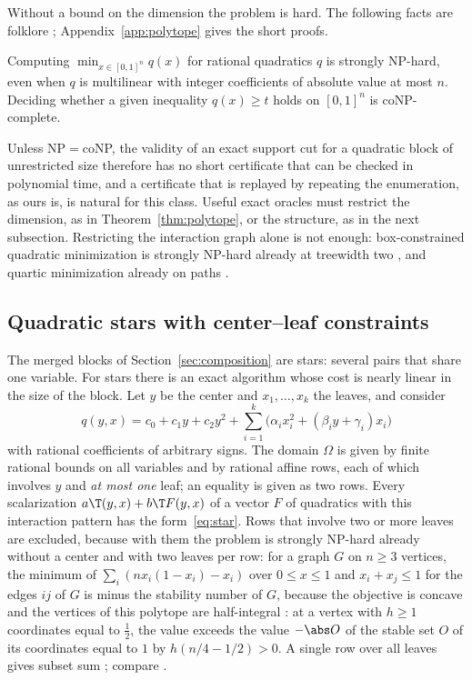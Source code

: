 Without a bound on the dimension the problem is hard. The following facts
are folklore \citep[Section~2.3]{BurerLetchford2009}; Appendix~\ref{app:polytope}
gives the short proofs.

\begin{proposition}\label{prop:maxcut}
Computing $\min_{x\in[0,1]^n}q(x)$ for rational quadratics $q$ is strongly
NP-hard, even when $q$ is multilinear with integer coefficients of absolute
value at most $n$. Deciding whether a given inequality $q(x)\ge t$ holds on
$[0,1]^n$ is coNP-complete.
\end{proposition}

Unless NP${}={}$coNP, the validity of an exact support cut for a quadratic
block of unrestricted size therefore has no short certificate that can be
checked in polynomial time, and a certificate that is replayed by repeating
the enumeration, as ours is, is natural for this class. Useful exact oracles
must restrict the dimension, as in Theorem~\ref{thm:polytope}, or the
structure, as in the next subsection. Restricting the interaction graph alone
is not enough: box-constrained quadratic minimization is strongly NP-hard
already at treewidth two \citep[Theorem~3]{DelPiaKhajavirad2026}, and quartic
minimization already on paths \citep[Theorem~2]{DelPiaKhajavirad2026}.

\subsection{Quadratic stars with center--leaf constraints}\label{sec:star}

The merged blocks of Section~\ref{sec:composition} are stars: several pairs
that share one variable. For stars there is an exact
algorithm whose cost is nearly linear in the size of the block. Let $y$ be
the center and $x_1,\dots,x_k$ the leaves, and consider
\begin{equation}\label{eq:star}
q(y,x)=c_0+c_1y+c_2y^2+\sum_{i=1}^k\bigl(\alpha_ix_i^2+(\beta_iy+\gamma_i)x_i\bigr)
\end{equation}
with rational coefficients of arbitrary signs. The domain $\Omega$ is given by
finite rational bounds on all variables and by rational affine rows, each of
which involves $y$ and \emph{at most one} leaf; an equality is given as two
rows. Every scalarization $a\T(y,x)+b\T F(y,x)$ of a vector $F$ of quadratics
with this interaction pattern has the form~\eqref{eq:star}. Rows that involve
two or more leaves are excluded, because with them the problem is strongly
NP-hard already without a center and with two leaves per row: for a graph $G$
on $n\ge3$ vertices, the minimum of $\sum_i(nx_i(1-x_i)-x_i)$ over $0\le x\le1$
and $x_i+x_j\le1$ for the edges $ij$ of $G$ is minus the stability number of
$G$, because the objective is concave and the vertices of this polytope are
half-integral \citep{NemhauserTrotter1974}: at a vertex with $h\ge1$ coordinates
equal to $\tfrac12$, the value exceeds the value $-\abs O$ of the stable set $O$ of
its coordinates equal to $1$ by $h(n/4-1/2)>0$. A single row over all leaves gives subset sum
\citep{Karp1972}; compare \citet{MoreVavasis1990}.

